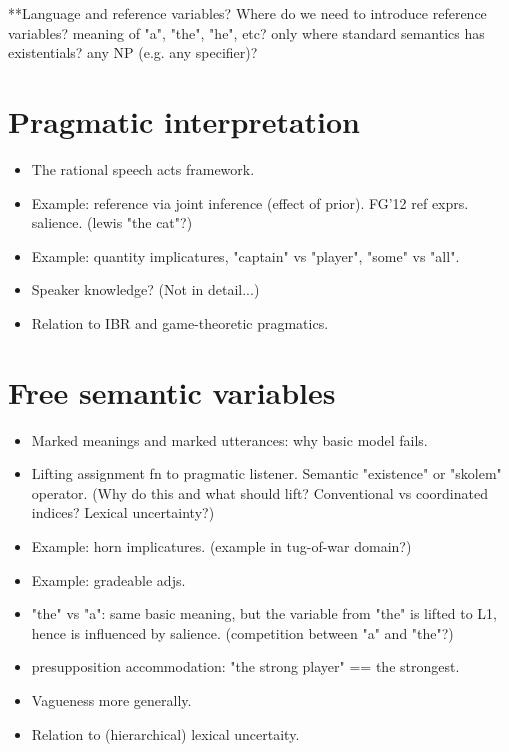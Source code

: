 \documentclass[12pt]{article}
\begin{document}
 **Language and reference variables? Where do we need to introduce reference variables? meaning of "a", "the", "he", etc? only where standard semantics has existentials? any NP (e.g. any specifier)? 


\section{Pragmatic interpretation}

\begin{itemize}
\item   The rational speech acts framework.
\item  Example: reference via joint inference (effect of prior). FG'12 ref exprs. salience. (lewis "the cat"?)
\item  Example: quantity implicatures, "captain" vs "player", "some" vs "all".
\item  Speaker knowledge? (Not in detail...)
\item  Relation to IBR and game-theoretic pragmatics.
\end{itemize}



\section{Free semantic variables}
\begin{itemize}
\item   Marked meanings and marked utterances: why basic model fails.
\item  Lifting assignment fn to pragmatic listener. Semantic "existence" or "skolem" operator.  (Why do this and what should lift? Conventional vs coordinated indices? Lexical uncertainty?)
\item  Example: horn implicatures. (example in tug-of-war domain?)
\item  Example: gradeable adjs.
\item  "the" vs "a": same basic meaning, but the variable from "the" is lifted to L1, hence is influenced by salience. (competition between "a" and "the"?)
\item  presupposition accommodation: "the strong player" == the strongest.
\item  Vagueness more generally.
\item  Relation to (hierarchical) lexical uncertaity.
\end{itemize}
\end{document}
